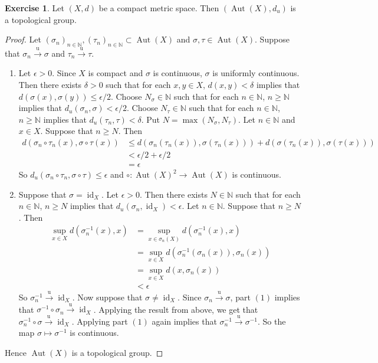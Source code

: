 \documentclass[12pt]{amsart}
\theoremstyle{definition}
\newtheorem{ex}[definition]{Exercise}
\newcommand{\del}{\delta}
\newcommand{\ep}{\epsilon}
\newcommand{\sig}{\sigma}
\newcommand{\N}{\mathbb{N}}
\newcommand{\convt}[1]{\xrightarrow{\text{#1}}}
\DeclareMathOperator{\id}{id}
\DeclareMathOperator{\Aut}{Aut}
\DeclareMathOperator*{\0}{\mbf{0}}
\DeclareMathOperator*{\1}{\mbf{1}}
\newcommand{\lex}[1]{\label{ex:#1}}
\begin{document}
	\begin{ex} \lex{}
	Let $(X, d)$ be a compact metric space. Then $(\Aut(X), d_{u} )$ is a topological group.
	\end{ex}
	
	\begin{proof}
	Let $(\sig_n)_{n \in \N}, (\tau_n)_{n \in \N} \subset \Aut(X)$ and $\sig,\tau \in \Aut(X)$. Suppose that $\sig_n \convt{u} \sig$ and $\tau_n \convt{u} \tau$.
	\begin{enumerate}
	\item Let $\ep >0$. Since $X$ is compact and $\sig$ is continuous, $\sig$ is uniformly continuous. Then there exists $\del >0$ such that for each $x, y \in X$, $d(x,y) < \del$ implies that $d(\sig(x), \sig(y)) \leq \ep/2$.  Choose $N_\sig \in \N$ such that for each $n \in \N$, $ n \geq \N$ implies that $d_u(\sig_n, \sig) < \ep/2$. Choose $N_\tau \in \N$ such that for each $n \in \N$, $ n \geq \N$ implies that $d_u(\tau_n, \tau) < \del$. Put $N = \max(N_\sig, N_\tau)$. Let $n \in \N$ and $x \in X$. Suppose that $n \geq N$. Then 
	\begin{align*}
		d(\sig_n \circ \tau_n (x) ,\sig \circ \tau (x) ) 
		&\leq  d(\sig_n(\tau_n(x)),  \sig(\tau_n(x))) + d( \sig(\tau_n (x)), \sig( \tau (x))) \\
		& < \ep / 2 +\ep / 2 \\
		&= \ep 
	\end{align*}
	So $d_u(\sig_n \circ \tau_n, \sig\circ \tau) \leq \ep$ and $\circ: \Aut(X)^2 \rightarrow \Aut(X)$ is continuous. 
	\item Suppose that $\sig = \id_X$. Let $\ep >0$. Then there exists $N \in \N$ such that for each $n \in \N$, $n \geq N$ implies that $d_u(\sig_n, \id_X) < \ep$. Let $n \in \N$. Suppose that $n \geq N$. Then 
	\begin{align*}
	\sup_{x \in X} d(\sig^{-1}_n(x), x) 
	&= \sup_{x \in \sig_n(X)}d(\sig^{-1}_n(x), x) \\
	&= \sup_{x \in X}d(\sig^{-1}_n(\sig_n(x)), \sig_n(x)) \\
	&= \sup_{x \in X}d(x, \sig_n(x)) \\
	&< \ep
	\end{align*}
	So $\sig^{-1}_n \convt{u} \id_X$. Now suppose that $\sig \neq \id_X$. Since $\sig_n \convt{u} \sig$, part $(1)$ implies that $\sig^{-1} \circ \sig_n \convt{u} \id_X$. Applying the result from above, we get that $\sig_n^{-1} \circ \sig \convt{u} \id_X$. Applying part $(1)$ again implies that $\sig_n^{-1}  \convt{u}  \sig^{-1}$. So the map $\sig \mapsto \sig^{-1}$ is continuous. 
	\end{enumerate}
	Hence $\Aut(X)$ is a topological group. 
	\end{proof}
	
\end{document}
